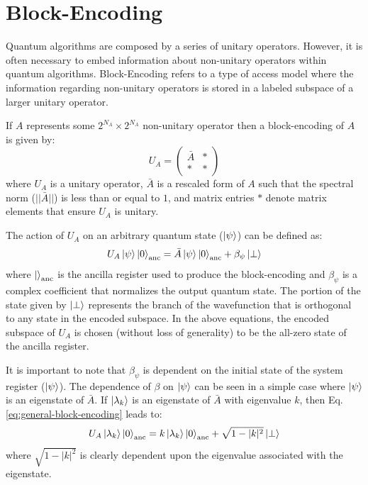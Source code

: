 \section{Block-Encoding}
\label{sec:block-encoding}

Quantum algorithms are composed by a series of unitary operators.
However, it is often necessary to embed information about non-unitary operators within quantum algorithms.
Block-Encoding refers to a type of access model where the information regarding non-unitary operators is stored in a labeled subspace of a larger unitary operator.

If $A$ represents some $2^{N_A}\times2^{N_A}$ non-unitary operator then a block-encoding of $A$ is given by:
\begin{equation}
    U_A = 
    \begin{pmatrix}
    \bar{A} & * \\
    * & * 
    \end{pmatrix}
\end{equation}
where $U_A$ is a unitary operator, $\bar{A}$ is a rescaled form of $A$ such that the spectral norm ($||\bar{A}||$) is less than or equal to $1$, and matrix entries $*$ denote matrix elements that ensure $U_A$ is unitary.

The action of $U_A$ on an arbitrary quantum state ($\ket{\psi}$) can be defined as:
\begin{equation}
    \label{eq:general-block-encoding}
    U_A \ket{\psi} \ket{0}_{\text{anc}} = \bar{A} \ket{\psi} \ket{0}_{\text{anc}} + \beta_\psi \ket{\perp}
\end{equation}
where $\ket{}_{\text{anc}}$ is the ancilla register used to produce the block-encoding and $\beta_\psi$ is a complex coefficient that normalizes the output quantum state.
The portion of the state given by $\ket{\perp}$ represents the branch of the wavefunction that is orthogonal to any state in the encoded subspace.
In the above equations, the encoded subspace of $U_A$ is chosen (without loss of generality) to be the all-zero state of the ancilla register.

It is important to note that $\beta_\psi$ is dependent on the initial state of the system register ($\ket{\psi}$).
The dependence of $\beta$ on $\ket{\psi}$ can be seen in a simple case where $\ket{\psi}$ is an eigenstate of $\bar{A}$.
If $\ket{\lambda_k}$ is an eigenstate of $\bar{A}$ with eigenvalue $k$, then Eq. \ref{eq:general-block-encoding} leads to:
\begin{equation}
    U_A \ket{\lambda_k} \ket{0}_{\text{anc}} = k \ket{\lambda_k} \ket{0}_{\text{anc}} + \sqrt{1 - |k|^2} \ket{\perp}
\end{equation}
where $\sqrt{1 - |k|^2}$ is clearly dependent upon the eigenvalue associated with the eigenstate.

